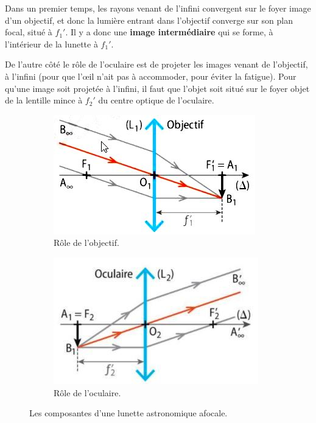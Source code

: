 \documentclass[11pt,a4paper]{article}
\begin{document}
Dans un premier temps, les rayons venant de l'infini convergent sur le foyer image d'un objectif, et donc la lumière entrant dans l'objectif converge sur son plan focal, situé à $f_1'$. Il y a donc une \textbf{image intermédiaire} qui se forme, à l'intérieur de la lunette à $f_1'$. 

De l'autre côté le rôle de l'oculaire est de projeter les images venant de l'objectif, à l'infini (pour que l'\oe il n'ait pas à accommoder, pour éviter la fatigue). Pour qu'une image soit projetée à l'infini, il faut que l'objet soit situé sur le foyer objet de la lentille mince à $f_2'$ du centre optique de l'oculaire. 

\begin{figure}[H]
\centering
\begin{subfigure}{.47\textwidth}
  \centering
  \includegraphics[width=.95\linewidth]{imgs/p6/objectif.jpg}
  \caption{Rôle de l'objectif. }
\end{subfigure}
\begin{subfigure}{.47\textwidth}
  \centering
  \includegraphics[width=.95\linewidth]{imgs/p6/oculaire.jpg}  
  \caption{Rôle de l'oculaire. }    
\end{subfigure}
\caption{Les composantes d'une lunette astronomique afocale.  } 
\end{figure}
\end{document}

